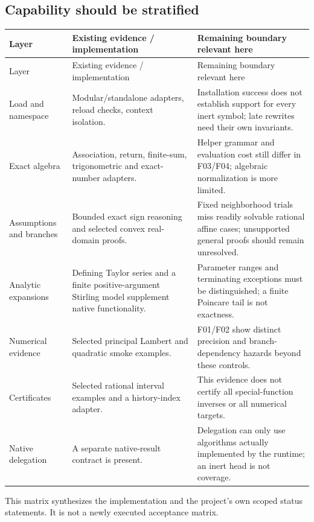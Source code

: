 \documentclass[11pt,letterpaper]{article}
\newcommand{\code}[1]{\texttt{\detokenize{#1}}}
\begin{document}
\subsection{Capability should be stratified}

\begin{longtable}{@{}P{1.24in}P{2.57in}P{2.47in}@{}}
\toprule
Layer & Existing evidence / implementation & Remaining boundary relevant here\\
\midrule\endfirsthead
\toprule Layer & Existing evidence / implementation & Remaining boundary relevant here\\\midrule\endhead
Load and namespace & Modular/standalone adapters, reload checks, context isolation. & Installation success does not establish support for every inert symbol; late rewrites need their own invariants.\\[5pt]
Exact algebra & Association, return, finite-sum, trigonometric and exact-number adapters. & Helper grammar and evaluation cost still differ in F03/F04; algebraic normalization is more limited.\\[5pt]
Assumptions and branches & Bounded exact sign reasoning and selected convex real-domain proofs. & Fixed neighborhood trials miss readily solvable rational affine cases; unsupported general proofs should remain unresolved.\\[5pt]
Analytic expansions & Defining Taylor series and a finite positive-argument Stirling model supplement native functionality. & Parameter ranges and terminating exceptions must be distinguished; a finite Poincare tail is not exactness.\\[5pt]
Numerical evidence & Selected principal Lambert and quadratic smoke examples. & F01/F02 show distinct precision and branch-dependency hazards beyond these controls.\\[5pt]
Certificates & Selected rational interval examples and a history-index adapter. & This evidence does not certify all special-function inverses or all numerical targets.\\[5pt]
Native delegation & A separate native-result contract is present. & Delegation can only use algorithms actually implemented by the runtime; an inert \code{Asymptotic} head is not coverage.\\
\bottomrule
\end{longtable}

This matrix synthesizes the implementation and the project's own scoped status statements.\cite{mathics-doc,mathics-taylor,mathics-special,mathics-algebra} It is not a newly executed acceptance matrix.
\end{document}
